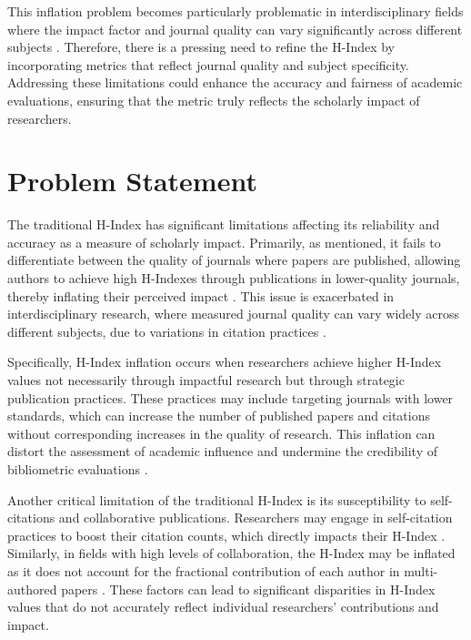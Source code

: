 This inflation problem becomes particularly problematic in interdisciplinary
fields where the impact factor and journal quality can vary significantly
across different subjects \cite{hirsch2005index,waltman2012inconsistency}.
Therefore, there is a pressing need to refine the H-Index by incorporating
metrics that reflect journal quality and subject specificity. Addressing these
limitations could enhance the accuracy and fairness of academic evaluations,
ensuring that the metric truly reflects the scholarly impact of researchers.

\section{Problem Statement}
The traditional H-Index has significant limitations affecting its reliability
and accuracy as a measure of scholarly impact. Primarily, as mentioned, it
fails to differentiate between the quality of journals where papers are
published, allowing authors to achieve high H-Indexes through publications in
lower-quality journals, thereby inflating their perceived impact
\cite{costas2007h,tonta2020monetary}. This issue is exacerbated in
interdisciplinary research, where measured journal quality can vary widely
across different subjects, due to variations in citation practices
\cite{costas2007h,norris2010h}.

Specifically, H-Index inflation occurs when researchers achieve higher H-Index
values not necessarily through impactful research but through strategic
publication practices. These practices may include targeting journals with
lower standards, which can increase the number of published papers and
citations without corresponding increases in the quality of research. This
inflation can distort the assessment of academic influence and undermine the
credibility of bibliometric evaluations \cite{tonta2020monetary}.

Another critical limitation of the traditional H-Index is its susceptibility to
self-citations and collaborative publications. Researchers may engage in
self-citation practices to boost their citation counts, which directly impacts
their H-Index
\cite{hirsch2005index,schreiber2008share,costas2007h,waltman2012inconsistency,norris2010h,bartneck2011detecting,zhivotovsky2008self}.
Similarly, in fields with high levels of collaboration, the H-Index may be
inflated as it does not account for the fractional contribution of each author
in multi-authored papers
\cite{schreiber2008share,costas2007h,waltman2012inconsistency,norris2010h,zhivotovsky2008self}.
These factors can lead to significant disparities in H-Index values that do not
accurately reflect individual researchers' contributions and impact.

